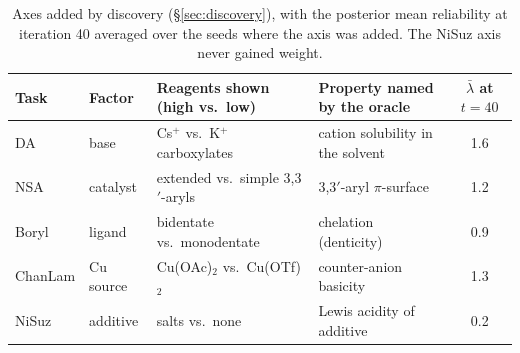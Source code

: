 \begin{table}[t]
\centering
\small
\setlength{\tabcolsep}{6pt}
\begin{tabular}{@{}l l l l c@{}}
\toprule
Task & Factor & Reagents shown (high vs.\ low) & Property named by the oracle & $\bar\lambda$ at $t{=}40$ \\
\midrule
DA & base & Cs$^+$ vs.\ K$^+$ carboxylates & cation solubility in the solvent & 1.6 \\
NSA & catalyst & extended vs.\ simple 3,3$'$-aryls & 3,3$'$-aryl $\pi$-surface & 1.2 \\
Boryl & ligand & bidentate vs.\ monodentate & chelation (denticity) & 0.9 \\
ChanLam & Cu source & Cu(OAc)$_2$ vs.\ Cu(OTf)$_2$ & counter-anion basicity & 1.3 \\
NiSuz & additive & salts vs.\ none & Lewis acidity of additive & 0.2 \\
\bottomrule
\end{tabular}
\caption{Axes added by discovery (\S\ref{sec:discovery}), with the posterior mean reliability at iteration 40 averaged over the seeds where the axis was added. The NiSuz axis never gained weight.}
\label{tab:discovered}
\end{table}
